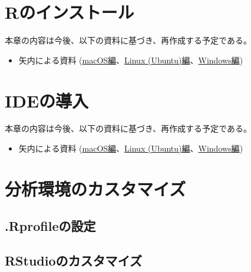 \documentclass[
  a4paper,
  pandoc,
  ja=standard,
  jafont=haranoaji]{bxjsbook}
\providecommand{\tightlist}{%
  \setlength{\itemsep}{0pt}\setlength{\parskip}{0pt}}
\begin{document}
\hypertarget{sec-installation}{%
\chapter{Rのインストール}\label{sec-installation}}

本章の内容は今後、以下の資料に基づき、再作成する予定である。

\begin{itemize}
\tightlist
\item
  矢内による資料
  (\href{https://yukiyanai.github.io/jp/resources/docs/install-R_macOS.pdf}{macOS編}、\href{https://yukiyanai.github.io/jp/resources/docs/install-R_ubuntu.pdf}{Linux
  (Ubuntu)編}、\href{https://yukiyanai.github.io/jp/resources/docs/install-R_windows.pdf}{Windows編})
\end{itemize}

\hypertarget{sec-ide}{%
\chapter{IDEの導入}\label{sec-ide}}

本章の内容は今後、以下の資料に基づき、再作成する予定である。

\begin{itemize}
\tightlist
\item
  矢内による資料
  (\href{https://yukiyanai.github.io/jp/resources/docs/install-R_macOS.pdf}{macOS編}、\href{https://yukiyanai.github.io/jp/resources/docs/install-R_ubuntu.pdf}{Linux
  (Ubuntu)編}、\href{https://yukiyanai.github.io/jp/resources/docs/install-R_windows.pdf}{Windows編})
\end{itemize}

\hypertarget{sec-customize}{%
\chapter{分析環境のカスタマイズ}\label{sec-customize}}

\hypertarget{Customize-rprofile}{%
\section{.Rprofileの設定}\label{Customize-rprofile}}

\hypertarget{Customize-rstudio}{%
\section{RStudioのカスタマイズ}\label{Customize-rstudio}}
\end{document}
